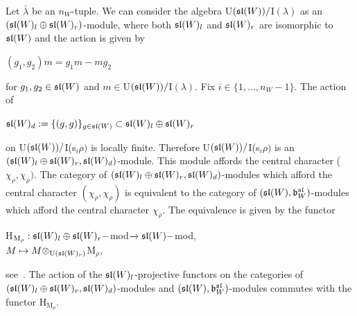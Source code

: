 \documentclass[12pt]{amsart}
\theoremstyle{definition}\newtheorem{theorem}{Theorem}[section]
\theoremstyle{definition}\newtheorem{definition}[proposition]{Definition}
\theoremstyle{remark}\newtheorem{example}[proposition]{Example}
\renewcommand{\to}[1][]{\xrightarrow{#1}}
\begin{document}
Let $\bar\lambda$ be an $n_W$-tuple. We can consider the algebra U$(\frak{sl}(W))/$I$(\lambda)$ as an $(\frak{sl}(W)_l\oplus\frak{sl}(W)_r)$-module, where both $\frak{sl}(W)_l$ and $\frak{sl}(W)_r$ are isomorphic to $\frak{sl}(W)$ and the action is given by \begin{center} $(g_1, g_2)m=g_1m-mg_2$\end{center}for $g_1, g_2\in\frak{sl}(W)$ and $m\in$U$(\frak{sl}(W))/$I$(\lambda)$.
Fix $i\in\{1,..., n_W-1\}$. The action of \begin{center}$\frak{sl}(W)_d:=\{(g, g)\}_{g\in\frak{sl}(W)}\subset\frak{sl}(W)_l\oplus\frak{sl}(W)_r$\end{center} on U$(\frak{sl}(W))/$I(s$_i\rho)$ is locally finite. Therefore U$(\frak{sl}(W))/$I(s$_i\rho)$ is an $(\frak{sl}(W)_l\oplus\frak{sl}(W)_r, \frak{sl}(W)_d)$-module. This module affords the central character ($\chi_\rho, \chi_\rho)$. The category of $(\frak{sl}(W)_l\oplus\frak{sl}(W)_r, \frak{sl}(W)_d)$-modules which afford the central character $(\chi_\rho, \chi_\rho)$ is equivalent to the category of $(\frak{sl}(W), \frak b^\frak{sl}_W)$-modules which afford the central character $\chi_\rho$. The equivalence is given by the functor\begin{center}
H$_{\mathrm M_\rho}: \frak{sl}(W)_l\oplus\frak{sl}(W)_r-$mod$\to \frak{sl}(W)-$mod,\\$ M\mapsto M\otimes_{\mathrm U(\frak{sl}(W)_r)}$M$_\rho$,\end{center}
see~\cite[Prop. 5.9]{BeG}. The action of the $\frak{sl}(W)_l$-projective functors on the categories of $(\frak{sl}(W)_l\oplus\frak{sl}(W)_r, \frak{sl}(W)_d)$-modules and $(\frak{sl}(W), \frak b^\frak{sl}_W)$-modules commutes with the functor H$_{\mathrm M_\rho}$.
\end{document}
